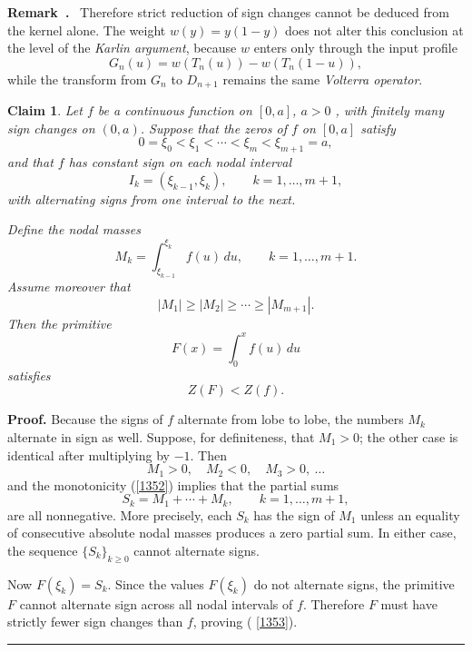 \documentclass[onecolumn]{article}
\newtheorem{claim}[theorem]{Claim}
\newenvironment{remark}{  \refstepcounter{theorem}  \par\medskip\noindent\textbf{Remark~\thetheorem.}\rmfamily\ }{\par\medskip}
\newenvironment{proof}[1][Proof]{\noindent\textbf{#1.} }{\ \rule{0.5em}{0.5em}}
\begin{document}
\begin{remark}
Therefore strict reduction of sign changes cannot be deduced from the kernel
alone. The weight $w(y)=y(1-y)$ does not alter this conclusion at the level
of the \textit{Karlin argument}, because $w$ enters only through the input
profile 
\begin{equation}
G_{n}(u)=w(T_{n}(u))-w(T_{n}(1-u)),  \label{1350}
\end{equation}%
while the transform from $G_{n}$ to $D_{n+1}$ remains the same \textit{%
Volterra operator}.
\end{remark}

\begin{claim}
\label{strict-drop-masses} Let $f$ be a continuous function on $[0,a]$, $a>0$%
, with finitely many sign changes on $(0,a)$. Suppose that the zeros of $f$
on $[0,a]$ satisfy 
\begin{equation*}
0=\xi _{0}<\xi _{1}<\cdots <\xi _{m}<\xi _{m+1}=a,
\end{equation*}%
and that $f$ has constant sign on each nodal interval 
\begin{equation*}
I_{k}=(\xi _{k-1},\xi _{k}),\qquad k=1,\dots ,m+1,
\end{equation*}%
with alternating signs from one interval to the next.

Define the nodal masses 
\begin{equation}
M_{k}=\int_{\xi _{k-1}}^{\xi _{k}}f(u)\,du,\qquad k=1,\dots ,m+1.
\label{1351}
\end{equation}%
Assume moreover that 
\begin{equation}
|M_{1}|\geq |M_{2}|\geq \cdots \geq |M_{m+1}|.  \label{1352}
\end{equation}%
Then the primitive 
\begin{equation*}
F(x)=\int_{0}^{x}f(u)\,du
\end{equation*}%
satisfies 
\begin{equation}
Z(F)<Z(f).  \label{1353}
\end{equation}
\end{claim}

\begin{proof}
Because the signs of $f$ alternate from lobe to lobe, the numbers $M_{k}$
alternate in sign as well. Suppose, for definiteness, that $M_{1}>0$; the
other case is identical after multiplying by $-1$. Then 
\begin{equation*}
M_{1}>0,\quad M_{2}<0,\quad M_{3}>0,\ \dots
\end{equation*}%
and the monotonicity (\ref{1352}) implies that the partial sums 
\begin{equation*}
S_{k}=M_{1}+\cdots +M_{k},\qquad k=1,\dots ,m+1,
\end{equation*}%
are all nonnegative. More precisely, each $S_{k}$ has the sign of $M_{1}$
unless an equality of consecutive absolute nodal masses produces a zero
partial sum. In either case, the sequence $\{S_{k}\}_{k\geq 0}$ cannot
alternate signs.

Now $F(\xi _{k})=S_{k}$. Since the values $F(\xi _{k})$ do not alternate
signs, the primitive $F$ cannot alternate sign across all nodal intervals of 
$f$. Therefore $F$ must have strictly fewer sign changes than $f$, proving (%
\ref{1353}). \hfill
\end{proof}
\end{document}
